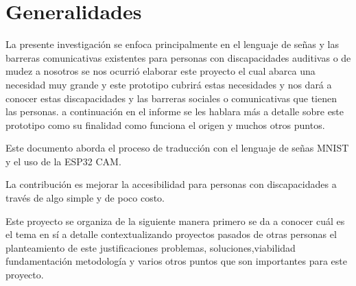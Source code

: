\documentclass[letter,12pt]{report}
\begin{document}
\cleardoublepage
{}
\setcounter{page}{1}








\chapter{Generalidades}
La presente investigación se enfoca principalmente en el lenguaje de señas y las barreras comunicativas existentes para personas con discapacidades auditivas o de mudez a nosotros se nos ocurrió elaborar este proyecto el cual abarca una necesidad muy grande y este prototipo cubrirá estas necesidades y nos dará a conocer estas discapacidades y las barreras sociales o comunicativas que tienen las personas.  a continuación en el informe se les hablara más a detalle sobre este prototipo como su finalidad como funciona el origen  y muchos otros puntos. 

 Este documento aborda el proceso de traducción con el lenguaje de señas MNIST y el uso de la ESP32 CAM. 

La contribución es mejorar la  accesibilidad para personas con discapacidades a través de algo simple y de poco costo. 

Este proyecto se organiza de la siguiente manera primero se da a conocer cuál es el tema en sí a detalle contextualizando proyectos pasados de otras personas el planteamiento de este justificaciones problemas, soluciones,viabilidad fundamentación  metodología  y varios otros puntos que son importantes para este proyecto.
\end{document}
